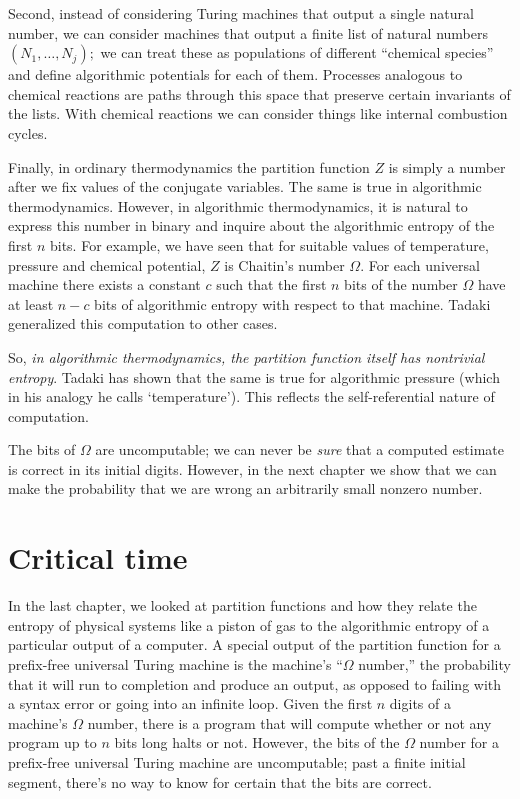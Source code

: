 \documentclass[12pt,twoside,openright]{report}
\begin{document}
Second, instead of considering Turing machines that output a single natural number, we can consider machines that output a finite list of natural numbers $(N_1, \ldots, N_j);$ we can treat these as populations of different ``chemical species'' and define algorithmic potentials for each of them.  Processes analogous to chemical reactions are paths through this space that preserve certain invariants of the lists.  With chemical reactions we can consider things like internal combustion cycles.

Finally, in ordinary thermodynamics the partition function $Z$ is simply a number after we fix values of the conjugate variables.  The same is true in algorithmic thermodynamics.  However, in algorithmic thermodynamics, it is natural to express this number in binary and inquire about the algorithmic entropy of the first $n$ bits.  For example, we have seen that for suitable values of temperature, pressure and chemical potential, $Z$ is Chaitin's number $\Omega$. For each universal machine there exists a constant $c$ such that the first $n$ bits of the number $\Omega$ have at least 
$n - c$ bits of algorithmic entropy with respect to that machine.  Tadaki \cite{Tadaki2002} generalized this computation to other cases.

So, \textit{in algorithmic thermodynamics, the partition function itself has nontrivial entropy}.  Tadaki has shown that the same is true for algorithmic pressure (which in his analogy he calls `temperature').   This reflects the self-referential nature of computation.  

The bits of $\Omega$ are uncomputable; we can never be {\em sure} that a computed estimate is correct in its initial digits.  However, in the next chapter we show that we can make the probability that we are wrong an arbitrarily small nonzero number.  

\chapter{Critical time}

In the last chapter, we looked at partition functions and how they relate the entropy of physical systems like a piston of gas to the algorithmic entropy of a particular output of a computer.  A special output of the partition function for a prefix-free universal Turing machine is the machine's ``$\Omega$ number,'' the probability that it will run to completion and produce an output, as opposed to failing with a syntax error or going into an infinite loop.  Given the first $n$ digits of a machine's $\Omega$ number, there is a program that will compute whether or not any program up to $n$ bits long halts or not.  However, the bits of the $\Omega$ number for a prefix-free universal Turing machine are uncomputable; past a finite initial segment, there's no way to know for certain that the bits are correct.
\end{document}
